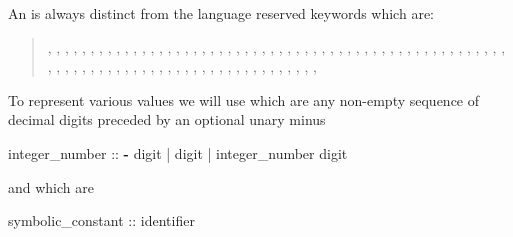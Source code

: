 %
An  is always distinct from the \nusmv language
reserved keywords which are: \label{list of reserved keywords}\\
\begin{quote}
%
, , ,
, 
, , , ,
, ,
, , , ,
, ,
, , ,
,
, , ,
, , , ,
, , , ,
, , ,
, , , ,
, , 
,
, , , ,
, , , , ,
, ,
,
, , , ,
, , , , ,
, , , , ,
, , , ,
, , , ,
, , , ,
, , , ,
, , , 
\end{quote}

To represent various values we will use 
which are any non-empty sequence of decimal digits preceded by an
optional unary minus

\begin{Grammar}
integer_number ::
        \textbf{-} digit
      | digit
      | integer_number digit                        
\end{Grammar}

\noindent and  which are 

\begin{Grammar}
  symbolic_constant :: identifier
\end{Grammar}

